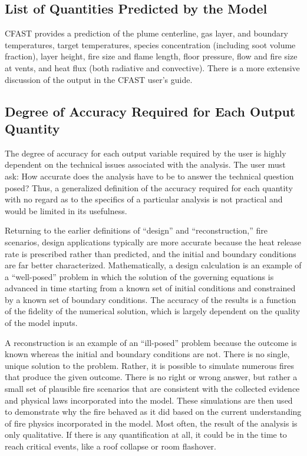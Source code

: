 \subsection{List of Quantities Predicted by the Model}

CFAST provides a prediction of the plume centerline, gas layer, and boundary temperatures, target temperatures, species concentration (including soot volume fraction), layer height, fire size and flame length, floor pressure, flow and fire size at vents, and heat flux (both radiative and convective). There is a more extensive discussion of the output in the CFAST user's guide.

\subsection{Degree of Accuracy Required for Each Output Quantity}

The degree of  accuracy for each output variable  required by the user is  highly  dependent on  the  technical  issues  associated with  the analysis.  The user  must ask: How accurate does  the analysis have to be  to  answer  the  technical  question posed?  Thus,  a  generalized definition of the  accuracy required for each quantity  with no regard as  to the specifics  of a  particular analysis  is not  practical and would be limited in its usefulness.

Returning   to    the   earlier   definitions    of   ``design''   and ``reconstruction,'' fire scenarios, design applications  typically are  more accurate because the heat release rate is prescribed rather than predicted, and the    initial    and    boundary    conditions   are    far    better characterized. Mathematically, a design calculation is an example of a ``well-posed''  problem  in  which   the  solution  of  the  governing equations is  advanced in  time starting from  a known set  of initial conditions and constrained by a known set of boundary conditions.  The accuracy of the results is a function of the fidelity of the numerical solution, which is  largely dependent on the quality of the model inputs.

A reconstruction is an example of an ``ill-posed'' problem because the outcome  is known  whereas  the initial  and  boundary conditions  are not. There is  no single, unique solution to the  problem. Rather, it is possible to simulate numerous fires that produce the given outcome. There is no right or wrong answer, but rather a small set of plausible fire scenarios that are  consistent with the collected evidence and physical laws incorporated into the model. These simulations are then used to demonstrate why the fire behaved as it did  based on the current understanding of fire physics  incorporated in  the model.  Most  often, the  result of  the
analysis is only  qualitative. If there is any  quantification at all, it could be in the time to reach critical events, like a roof collapse or room flashover.

